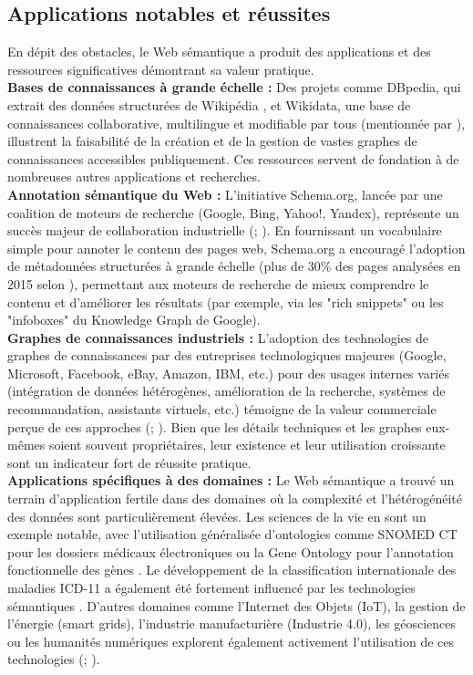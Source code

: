 \documentclass[9pt,twocolumn,twoside,french]{opticajnl}
\begin{document}
\subsection{Applications notables et réussites}
En dépit des obstacles, le Web sémantique a produit des applications et des ressources significatives démontrant sa valeur pratique. \\
\textbf{Bases de connaissances à grande échelle :} Des projets comme DBpedia, qui extrait des données structurées de Wikipédia \citep{Lehmann2015Dbpediaa}, et Wikidata, une base de connaissances collaborative, multilingue et modifiable par tous (mentionnée par \citealp{Hitzler2021}), illustrent la faisabilité de la création et de la gestion de vastes graphes de connaissances accessibles publiquement. Ces ressources servent de fondation à de nombreuses autres applications et recherches. \\
\textbf{Annotation sémantique du Web :} L’initiative Schema.org, lancée par une coalition de moteurs de recherche (Google, Bing, Yahoo!, Yandex), représente un succès majeur de collaboration industrielle (\citealp{Guha2015Schemaorg}; \citealp{Hitzler2021}). En fournissant un vocabulaire simple pour annoter le contenu des pages web, Schema.org a encouragé l’adoption de métadonnées structurées à grande échelle (plus de 30\% des pages analysées en 2015 selon \citealp{Guha2015Schemaorg}), permettant aux moteurs de recherche de mieux comprendre le contenu et d’améliorer les résultats (par exemple, via les "rich snippets" ou les "infoboxes" du Knowledge Graph de Google). \\ %
\textbf{Graphes de connaissances industriels :} L’adoption des technologies de graphes de connaissances par des entreprises technologiques majeures (Google, Microsoft, Facebook, eBay, Amazon, IBM, etc.) pour des usages internes variés (intégration de données hétérogènes, amélioration de la recherche, systèmes de recommandation, assistants virtuels, etc.) témoigne de la valeur commerciale perçue de ces approches (\citealp{Noy2019Industryscale}; \citealp{Hitzler2021}). Bien que les détails techniques et les graphes eux-mêmes soient souvent propriétaires, leur existence et leur utilisation croissante sont un indicateur fort de réussite pratique. \\
\textbf{Applications spécifiques à des domaines :} Le Web sémantique a trouvé un terrain d’application fertile dans des domaines où la complexité et l’hétérogénéité des données sont particulièrement élevées. Les sciences de la vie en sont un exemple notable, avec l’utilisation généralisée d’ontologies comme SNOMED CT pour les dossiers médicaux électroniques ou la Gene Ontology pour l’annotation fonctionnelle des gènes \citep{Hitzler2021}. Le développement de la classification internationale des maladies ICD-11 a également été fortement influencé par les technologies sémantiques \citep{Hitzler2021}. D'autres domaines comme l’Internet des Objets (IoT), la gestion de l’énergie (smart grids), l’industrie manufacturière (Industrie 4.0), les géosciences ou les humanités numériques explorent également activement l’utilisation de ces technologies (\citealp{Sabou2020Semantics}; \citealp{Hitzler2021}).
\clearpage
\end{document}
